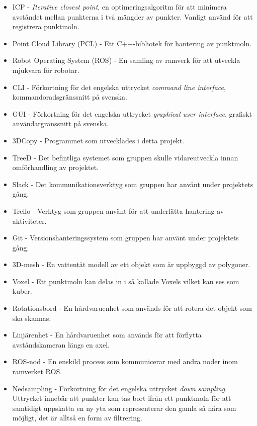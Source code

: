 \begin{itemize}
	\item ICP - \textit{Iterative closest point}, en optimeringsalgoritm för att minimera avståndet mellan punkterna i två mängder av punkter. Vanligt använd för att registrera punktmoln.
	\item Point Cloud Library (PCL) - Ett C++-bibliotek för hantering av punktmoln.
	\item Robot Operating System (ROS) - En samling av ramverk för att utveckla mjukvara för robotar.
	\item CLI - Förkortning för det engelska uttrycket \textit{command line interface}, kommandoradsgränssnitt på svenska.
	\item GUI - Förkortning för det engelska uttrycket \textit{graphical user interface}, grafiskt användargränssnitt på svenska.
	\item 3DCopy - Programmet som utvecklades i detta projekt.
	\item TreeD - Det befintliga systemet som gruppen skulle vidareutveckla innan omförhandling av projektet.
	\item Slack - Det kommunikationsverktyg som gruppen har använt under projektets gång.
	\item Trello - Verktyg som gruppen använt för att underlätta hantering av aktiviteter.
	\item Git - Versionshanteringssystem som gruppen har använt under projektets gång.
	\item 3D-mesh - En vattentät modell av ett objekt som är uppbyggd av polygoner.
	\item Voxel - Ett punktmoln kan delas in i så kallade Voxels vilket kan ses som kuber.
	\item Rotationsbord - En hårdvaruenhet som används för att rotera det objekt som ska skannas.
	\item Linjärenhet - En hårdvaruenhet som används för att förflytta avståndskameran längs en axel.
	\item ROS-nod - En enskild process som kommunicerar med andra noder inom ramverket ROS.
	\item Nedsampling - Förkortning för det engelska uttrycket \textit{down sampling}. Uttrycket innebär att punkter kan tas bort ifrån ett punktmoln för att samtidigt uppskatta en ny yta som representerar den gamla så nära som möjligt, det är alltså en form av filtrering.
\end{itemize} 


